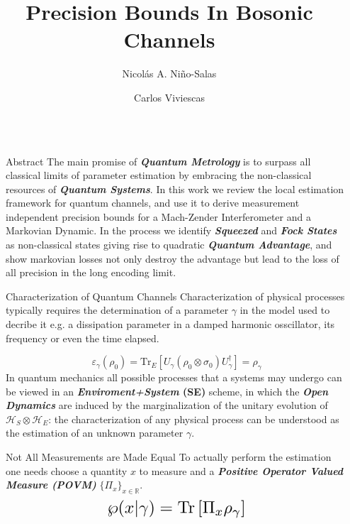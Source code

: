 \documentclass[final]{beamer}
\title{ Precision Bounds In Bosonic Channels}
\author{Nicolás A. Niño-Salas  \and Carlos Viviescas }
\institute[shortinst]{Universidad Nacional de Colombia, Sede Bogotá }
\newlength{\sepwidth}
\newlength{\colwidth}
\newcommand{\separatorcolumn}{\begin{column}{\sepwidth}\end{column}}
\begin{document}
\begin{frame}[t]
\begin{columns}[t]
\separatorcolumn

\begin{column}{\colwidth}

  \begin{block}{Abstract}
    The main promise of \textit{\textbf{Quantum Metrology}} is to surpass all classical limits of \mbox{parameter} estimation
    by embracing the non-classical resources of \textbf{\textit{Quantum
        Systems}}.
    In this work we review the local estimation framework for quantum
    channels, and use it to derive measurement
    independent precision bounds for a Mach-Zender \mbox{Interferometer} and a Markovian Dynamic.
    In the process we identify \textit{\textbf{Squeezed}} and \textit{\textbf{Fock States}} as  non-classical
    states giving rise to quadratic \textit{\textbf{Quantum Advantage}}, and show markovian losses not only
    destroy  the advantage but lead to the loss of all precision in the long encoding limit.

  \end{block}

  \begin{block}{Characterization of Quantum Channels}
  Characterization of physical processes typically requires the determination of a parameter $\gamma$ in the model used to decribe it e.g.
  a dissipation parameter in a damped harmonic osscillator, its frequency or even the time elapsed.%
\vspace{-0.04\linewidth}
  
 \vspace{-0.15\linewidth}
{\Large
  \begin{equation*}
       \varepsilon_{\gamma}\left(\rho_{0}\right)=\mathrm{Tr}_{E}\left[ U_{\gamma}\left( \rho_{0} \otimes \sigma_{0} \right)U_{\gamma}^{\dagger}\right]=\rho_{\gamma}
  \end{equation*}
}
  In quantum mechanics all possible processes that a systems may undergo can be viewed in an \textbf{\textit{Enviroment+System} (SE)} scheme,
in which the \textit{\textbf{Open Dynamics}} are induced by the marginalization of the unitary evolution of
$\mathcal{H}_{S}\otimes\mathcal{H}_{E}$: the characterization of any physical process can be understood as the estimation of an unknown parameter $\gamma$.
  \end{block}
  \begin{block}{Not All Measurements are Made Equal}
    To actually perform the estimation one needs choose a quantity $x$ to measure and a \textbf{\textit{Positive
      Operator Valued Measure (POVM)}} $\{\Pi_{x}\}_{x \in \mathbb{R}}$.
\[\scalebox{1.7}{$\displaystyle \wp(x|\gamma)= \mathrm{Tr}\left[\Pi_{x} \rho_{\gamma}\right] $}\]


\end{block}
\end{column}
\end{columns}
\end{frame}
\end{document}
